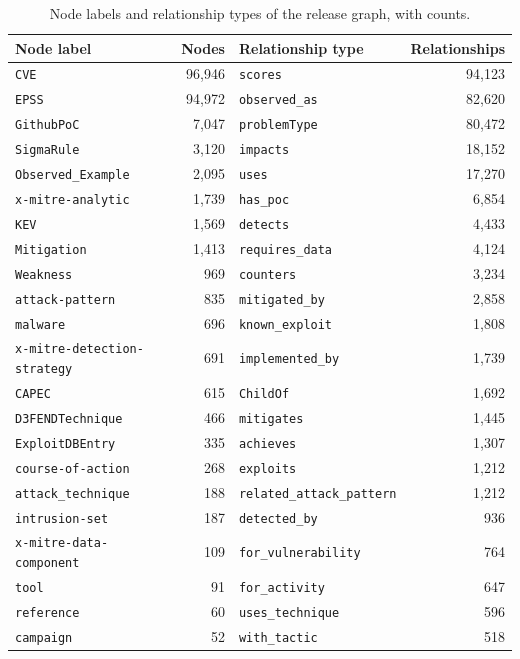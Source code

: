 \documentclass[11pt,a4paper]{article}
\begin{document}
\begin{table}[ht]
\centering\small
\caption{Node labels and relationship types of the release graph, with counts.}\label{tab:graphcounts}
\begin{tabular}{@{}lr@{\qquad}lr@{}}
\toprule Node label & Nodes & Relationship type & Relationships \\\midrule
\texttt{CVE} & 96,946 & \texttt{scores} & 94,123 \\
\texttt{EPSS} & 94,972 & \texttt{observed\_as} & 82,620 \\
\texttt{GithubPoC} & 7,047 & \texttt{problemType} & 80,472 \\
\texttt{SigmaRule} & 3,120 & \texttt{impacts} & 18,152 \\
\texttt{Observed\_Example} & 2,095 & \texttt{uses} & 17,270 \\
\texttt{x-mitre-analytic} & 1,739 & \texttt{has\_poc} & 6,854 \\
\texttt{KEV} & 1,569 & \texttt{detects} & 4,433 \\
\texttt{Mitigation} & 1,413 & \texttt{requires\_data} & 4,124 \\
\texttt{Weakness} & 969 & \texttt{counters} & 3,234 \\
\texttt{attack-pattern} & 835 & \texttt{mitigated\_by} & 2,858 \\
\texttt{malware} & 696 & \texttt{known\_exploit} & 1,808 \\
\texttt{x-mitre-detection-strategy} & 691 & \texttt{implemented\_by} & 1,739 \\
\texttt{CAPEC} & 615 & \texttt{ChildOf} & 1,692 \\
\texttt{D3FENDTechnique} & 466 & \texttt{mitigates} & 1,445 \\
\texttt{ExploitDBEntry} & 335 & \texttt{achieves} & 1,307 \\
\texttt{course-of-action} & 268 & \texttt{exploits} & 1,212 \\
\texttt{attack\_technique} & 188 & \texttt{related\_attack\_pattern} & 1,212 \\
\texttt{intrusion-set} & 187 & \texttt{detected\_by} & 936 \\
\texttt{x-mitre-data-component} & 109 & \texttt{for\_vulnerability} & 764 \\
\texttt{tool} & 91 & \texttt{for\_activity} & 647 \\
\texttt{reference} & 60 & \texttt{uses\_technique} & 596 \\
\texttt{campaign} & 52 & \texttt{with\_tactic} & 518 \\

\end{tabular}
\end{table}
\end{document}
